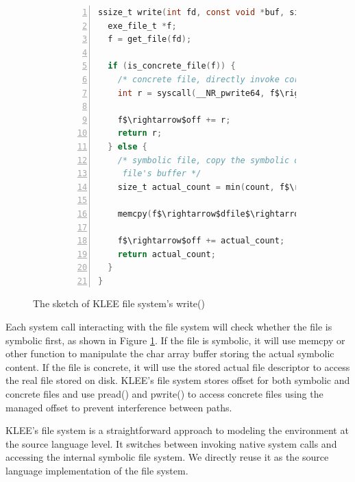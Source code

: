 \documentclass[sigplan, nonacm]{acmart}\settopmatter{printfolios=true,printccs=false,printacmref=false}
\newcommand{\tool}{\textsc{GenSym}\xspace}
\begin{document}
\begin{figure}[t]
\centering
\begin{subfigure}{0.5\textwidth}
\begin{lstlisting}[style=small,language=C,numbers=left,stepnumber=1,xleftmargin=2em,numberstyle=\ttfamily]
ssize_t write(int fd, const void *buf, size_t count) {
  exe_file_t *f;
  f = get_file(fd);

  if (is_concrete_file(f)) {
    /* concrete file, directly invoke corresponding native syscall */
    int r = syscall(__NR_pwrite64, f$\rightarrow$fd, buf, count, (off64_t) f$\rightarrow$off);

    f$\rightarrow$off += r;
    return r;
  } else {
    /* symbolic file, copy the symbolic data from buf into current
     file's buffer */
    size_t actual_count = min(count, f$\rightarrow$dfile->size - f$\rightarrow$off);

    memcpy(f$\rightarrow$dfile$\rightarrow$contents + f$\rightarrow$off, buf, actual_count);

    f$\rightarrow$off += actual_count;
    return actual_count;
  }
}
\end{lstlisting}
\vspace{-1em}
\end{subfigure}
\caption{The sketch of KLEE file system's write() }
\vspace{-0.3in}
\label{fig:example}
\end{figure}

Each system call interacting with the file system will check whether the file is symbolic first, as shown in Figure \ref{fig:example}. If the file is symbolic, it will use memcpy or other function to manipulate the char array buffer storing the actual symbolic content. If the file is concrete, it will use the stored actual file descriptor to access the real file stored on disk. KLEE's file system stores offset for both symbolic and concrete files and use pread() and pwrite() to access concrete files using the managed offset to prevent interference between paths.\par
KLEE's file system is a straightforward approach to modeling the environment at the source language level. It switches between invoking native system calls and accessing the internal symbolic file system. We directly reuse it as the source language implementation of the file system.
\end{document}
